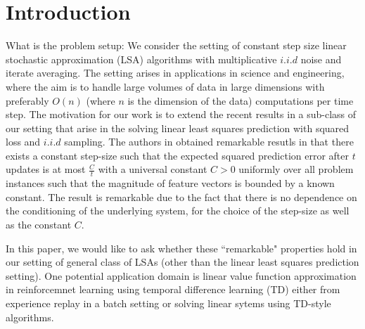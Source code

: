 \section{Introduction}
What is the problem setup:
We consider the setting of constant step size linear stochastic approximation (LSA) algorithms with multiplicative $i.i.d$ noise and iterate averaging. The setting arises in applications in science and engineering, where the aim is to handle large volumes of data in large dimensions with preferably $O(n)$ (where $n$ is the dimension of the data) computations per time step. The motivation for our work is to extend the recent results \cite{bachharder} in a sub-class of our setting that arise in the solving linear least squares prediction with squared loss and $i.i.d$ sampling. The authors in \cite{bachharder} obtained remarkable resutls in that there exists a constant step-size such that the expected squared prediction error after $t$ updates is at most $\frac{C}{t}$ with a universal constant $C>0$ uniformly over all problem instances such that the magnitude of feature vectors is bounded by a known constant. The result is remarkable due to the fact that there is no dependence on the conditioning of the underlying system, for the choice of the step-size as well as the constant $C$.\par
In this paper, we would like to ask whether these ``remarkable" properties hold in our setting of general class of LSAs (other than the linear least squares prediction setting). One potential application domain is linear value function approximation in reinforcemnet learning using temporal difference learning (TD) either from experience replay in a batch setting or solving linear sytems using TD-style algorithms.
